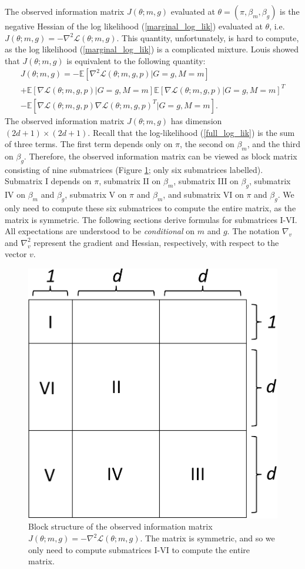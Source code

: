 \documentclass[12pt]{article}
\begin{document}
\begin{appendices}
\begin{refsection}
		The observed information matrix $J(\theta; m, g)$ evaluated at $\theta = (\pi, \beta_m, \beta_g)$ is the negative Hessian of the log likelihood (\ref{marginal_log_lik}) evaluated at $\theta$, i.e.
		$J(\theta; m, g) = - \nabla^2\mathcal{L}(\theta; m, g) .$ This quantity, unfortunately, is hard to compute, as the log likelihood (\ref{marginal_log_lik}) is a complicated mixture. Louis \cite{Louis1982} showed that $J(\theta; m, g)$ is equivalent to the following quantity:
		\begin{multline}\label{zero_inf_info_mat}
		J(\theta; m, g) = -\mathbb{E} \left[\nabla^2 \mathcal{L}(\theta; m, g, p) | G = g, M = m \right] \\ + \mathbb{E}\left[\nabla \mathcal{L}(\theta; m, g, p) | G = g, M = m \right] \mathbb{E}\left[\nabla \mathcal{L}(\theta; m, g, p) | G = g, M = m \right]^T \\ - \mathbb{E}\left[ \nabla\mathcal{L}(\theta; m, g, p) \nabla \mathcal{L}(\theta; m, g, p)^T | G = g, M = m \right].
		\end{multline}
		The observed information matrix $J(\theta; m, g)$ has dimension $(2d+1) \times (2d + 1).$ Recall that the log-likelihood (\ref{full_log_lik}) is the sum of three terms. The first term depends only on $\pi$, the second on $\beta_m$, and the third on $\beta_g$. Therefore, the observed information matrix can be viewed as block matrix consisting of nine submatrices (Figure \ref{infomatrixbackground}; only six submatrices labelled). Submatrix I depends on $\pi$, submatrix II on $\beta_m$, submatrix III on $\beta_g$, submatrix IV on $\beta_m$ and $\beta_g$, submatrix V on $\pi$ and $\beta_m$, and submatrix VI on $\pi$ and $\beta_g$. We only need to compute these six submatrices to compute the entire matrix, as the matrix is symmetric. The following sections derive formulas for submatrices I-VI. All expectations are understood to be \textit{conditional} on $m$ and $g$. The notation $\nabla_v$  and $\nabla^2_v$  represent the gradient and Hessian, respectively, with respect to the vector $v$.
		
		\begin{figure}
			\centering
			\includegraphics[width=0.45\linewidth]{../../figures/info_matrix/info_matrix_background}
			\caption{Block structure of the observed information matrix $J(\theta; m, g) = -\nabla^2 \mathcal{L}(\theta; m, g)$. The matrix is symmetric, and so we only need to compute submatrices I-VI to compute the entire matrix.}
			\label{infomatrixbackground}
		\end{figure}
		

\end{refsection}
\end{appendices}
\end{document}
